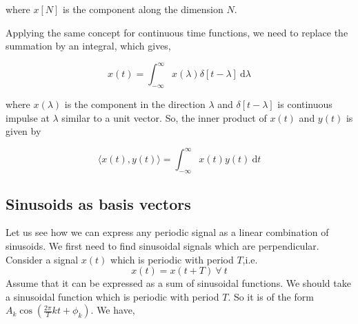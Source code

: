             where $x[N]$ is the component along the dimension $N$.
       
Applying the same concept for continuous time functions, we need to replace the summation by an integral, which gives,

					\begin{equation*}x(t) = \int_{-\infty}^{\infty} \! x(\lambda)\delta[t-\lambda] \ \mathrm{d}\lambda\end{equation*}
                    
             where $x(\lambda)$ is the component in the direction $\lambda$ and $\delta[t-\lambda]$ is continuous impulse at $\lambda$ similar to a unit vector. So, the inner product of $x(t)$ and $y(t)$ is given by
             
           \begin{equation*} \langle x(t),y(t) \rangle = \int_{-\infty}^{\infty} \! x(t)y(t) \ \mathrm{d} t\end{equation*}
             
 \subsection{Sinusoids as basis vectors}
          Let us see how we can express any periodic signal as a linear combination of sinusoids. We first need to find sinusoidal signals which are perpendicular. Consider a signal $x(t)$ which is periodic with period $T$,i.e. 
          \begin{equation*}
            x(t) = x(t+T) \ \forall \ t 
          \end{equation*}
          Assume that it can be expressed as a sum of sinusoidal functions. We should take a sinusoidal function which is periodic with period $T$. So it is of the form $A_k\cos (\frac{2\pi}{T}kt + \phi_k)$. We have,
          
